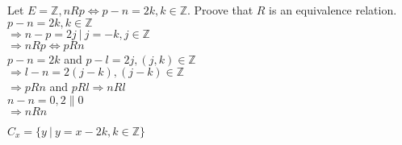 \documentclass{article}
\begin{document}
\noindent Let $ E = \mathbb{Z}, n R p \iff p - n = 2k, k \in \mathbb{Z} $. Proove that $R$ is an equivalence relation.\\
$ p - n = 2k, k \in \mathbb{Z}$\\
$\Rightarrow n - p = 2j \ | \ j = -k , j \in \mathbb{Z}$\\
$\Rightarrow n R p \iff p R n$\\

\noindent $  p - n = 2k $ and $ p - l = 2j , (j, k) \in \mathbb{Z} $ \\
$\Rightarrow  l - n = 2 (j - k) , (j-k) \in \mathbb{Z}$\\
$\Rightarrow p R n  $ and $ p R l \Rightarrow n R l$ \\

\noindent $ n - n =  0 , 2 \| 0 $\\
$\Rightarrow n R n$


$C_x = \{ y \ | \ y = x - 2k, k \in \mathbb{Z}\}$
\end{document}
